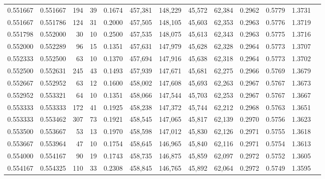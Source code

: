 \begin{tabular}{rrrrrrrrrrrrr}
0.551667 & 0.551667 &   194 &  39 &                                     0.1674 & 457,381 & 148,229 &  45,572 &  62,384 & 0.2962 & 0.5779 & 1.3731 \\
0.551667 & 0.551786 &   124 &  31 &                                     0.2000 & 457,505 & 148,105 &  45,603 &  62,353 & 0.2963 & 0.5776 & 1.3719 \\
0.551798 & 0.552000 &    30 &  10 &                                     0.2500 & 457,535 & 148,075 &  45,613 &  62,343 & 0.2963 & 0.5775 & 1.3716 \\
0.552000 & 0.552289 &    96 &  15 &                                     0.1351 & 457,631 & 147,979 &  45,628 &  62,328 & 0.2964 & 0.5773 & 1.3707 \\
0.552333 & 0.552500 &    63 &  10 &                                     0.1370 & 457,694 & 147,916 &  45,638 &  62,318 & 0.2964 & 0.5773 & 1.3702 \\
0.552500 & 0.552631 &   245 &  43 &                                     0.1493 & 457,939 & 147,671 &  45,681 &  62,275 & 0.2966 & 0.5769 & 1.3679 \\
0.552667 & 0.552952 &    63 &  12 &                                     0.1600 & 458,002 & 147,608 &  45,693 &  62,263 & 0.2967 & 0.5767 & 1.3673 \\
0.552952 & 0.553321 &    64 &  10 &                                     0.1351 & 458,066 & 147,544 &  45,703 &  62,253 & 0.2967 & 0.5767 & 1.3667 \\
0.553333 & 0.553333 &   172 &  41 &                                     0.1925 & 458,238 & 147,372 &  45,744 &  62,212 & 0.2968 & 0.5763 & 1.3651 \\
0.553333 & 0.553462 &   307 &  73 &                                     0.1921 & 458,545 & 147,065 &  45,817 &  62,139 & 0.2970 & 0.5756 & 1.3623 \\
0.553500 & 0.553667 &    53 &  13 &                                     0.1970 & 458,598 & 147,012 &  45,830 &  62,126 & 0.2971 & 0.5755 & 1.3618 \\
0.553667 & 0.553964 &    47 &  10 &                                     0.1754 & 458,645 & 146,965 &  45,840 &  62,116 & 0.2971 & 0.5754 & 1.3613 \\
0.554000 & 0.554167 &    90 &  19 &                                     0.1743 & 458,735 & 146,875 &  45,859 &  62,097 & 0.2972 & 0.5752 & 1.3605 \\
0.554167 & 0.554325 &   110 &  33 &                                     0.2308 & 458,845 & 146,765 &  45,892 &  62,064 & 0.2972 & 0.5749 & 1.3595 \\

\end{tabular}
